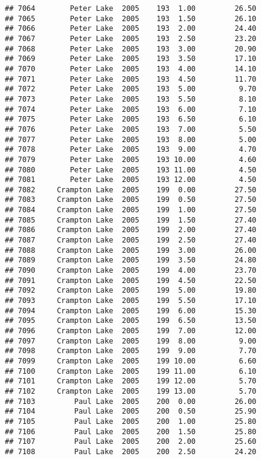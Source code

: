 \documentclass[
]{article}
\begin{document}
\begin{verbatim}
## 7064        Peter Lake  2005    193  1.00         26.50
## 7065        Peter Lake  2005    193  1.50         26.10
## 7066        Peter Lake  2005    193  2.00         24.40
## 7067        Peter Lake  2005    193  2.50         23.20
## 7068        Peter Lake  2005    193  3.00         20.90
## 7069        Peter Lake  2005    193  3.50         17.10
## 7070        Peter Lake  2005    193  4.00         14.10
## 7071        Peter Lake  2005    193  4.50         11.70
## 7072        Peter Lake  2005    193  5.00          9.70
## 7073        Peter Lake  2005    193  5.50          8.10
## 7074        Peter Lake  2005    193  6.00          7.10
## 7075        Peter Lake  2005    193  6.50          6.10
## 7076        Peter Lake  2005    193  7.00          5.50
## 7077        Peter Lake  2005    193  8.00          5.00
## 7078        Peter Lake  2005    193  9.00          4.70
## 7079        Peter Lake  2005    193 10.00          4.60
## 7080        Peter Lake  2005    193 11.00          4.50
## 7081        Peter Lake  2005    193 12.00          4.50
## 7082     Crampton Lake  2005    199  0.00         27.50
## 7083     Crampton Lake  2005    199  0.50         27.50
## 7084     Crampton Lake  2005    199  1.00         27.50
## 7085     Crampton Lake  2005    199  1.50         27.40
## 7086     Crampton Lake  2005    199  2.00         27.40
## 7087     Crampton Lake  2005    199  2.50         27.40
## 7088     Crampton Lake  2005    199  3.00         26.00
## 7089     Crampton Lake  2005    199  3.50         24.80
## 7090     Crampton Lake  2005    199  4.00         23.70
## 7091     Crampton Lake  2005    199  4.50         22.50
## 7092     Crampton Lake  2005    199  5.00         19.80
## 7093     Crampton Lake  2005    199  5.50         17.10
## 7094     Crampton Lake  2005    199  6.00         15.30
## 7095     Crampton Lake  2005    199  6.50         13.50
## 7096     Crampton Lake  2005    199  7.00         12.00
## 7097     Crampton Lake  2005    199  8.00          9.00
## 7098     Crampton Lake  2005    199  9.00          7.70
## 7099     Crampton Lake  2005    199 10.00          6.60
## 7100     Crampton Lake  2005    199 11.00          6.10
## 7101     Crampton Lake  2005    199 12.00          5.70
## 7102     Crampton Lake  2005    199 13.00          5.70
## 7103         Paul Lake  2005    200  0.00         26.00
## 7104         Paul Lake  2005    200  0.50         25.90
## 7105         Paul Lake  2005    200  1.00         25.80
## 7106         Paul Lake  2005    200  1.50         25.80
## 7107         Paul Lake  2005    200  2.00         25.60
## 7108         Paul Lake  2005    200  2.50         24.20

\end{verbatim}
\end{document}
